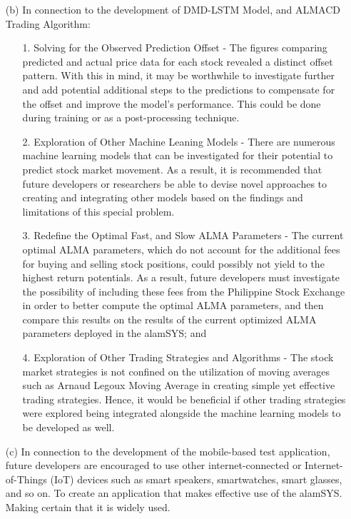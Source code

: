 \begin{itemize}
    \item[(b)] In connection to the development of DMD-LSTM Model, and ALMACD Trading Algorithm:
        \begin{itemize}
            \item[1.] Solving for the Observed Prediction Offset - 
            The figures comparing predicted and actual price data for each stock 
            revealed a distinct offset pattern. With this in mind, it may be 
            worthwhile to investigate further and add potential additional steps 
            to the predictions to compensate for the offset and improve the model's 
            performance. This could be done during training or as a post-processing 
            technique.
            \item[2.] Exploration of Other Machine Leaning Models - 
            There are numerous machine learning models that can be investigated for 
            their potential to predict stock market movement. As a result, it is 
            recommended that future developers or researchers be able to devise novel 
            approaches to creating and integrating other models based on the findings 
            and limitations of this special problem.
            \item[3.] Redefine the Optimal Fast, and Slow ALMA Parameters - 
            The current optimal ALMA parameters, which do not account for the 
            additional fees for buying and selling stock positions, could possibly 
            not yield to the highest return potentials. As a result, future developers 
            must investigate the possibility of including these fees from the 
            Philippine Stock Exchange in order to better compute the optimal 
            ALMA parameters, and then compare this results on the results of the
            current optimized ALMA parameters deployed in the alamSYS; and
            \item[4.] Exploration of Other Trading Strategies and Algorithms - 
            The stock market strategies is not confined on the utilization of moving 
            averages such as Arnaud Legoux Moving Average in creating simple yet 
            effective trading strategies. Hence, it would be beneficial if other trading 
            strategies were explored being integrated alongside the machine learning 
            models to be developed as well.
        \end{itemize}
    \item[(c)] In connection to the development of the mobile-based test application, 
    future developers are encouraged to use other internet-connected or 
    Internet-of-Things (IoT) devices such as smart speakers, smartwatches, 
    smart glasses, and so on. To create an application that makes effective 
    use of the alamSYS. Making certain that it is widely used.
\end{itemize}